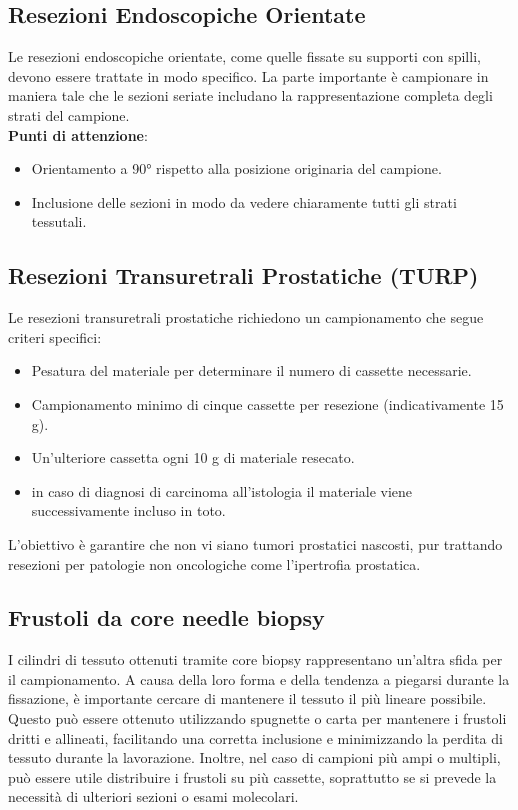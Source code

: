 \subsection{Resezioni Endoscopiche Orientate}
Le resezioni endoscopiche orientate, come quelle fissate su supporti con spilli, devono essere trattate in modo specifico. La parte importante è campionare in maniera tale che le sezioni seriate includano la rappresentazione completa degli strati del campione.
\\ \textbf{Punti di attenzione}:
\begin{itemize}
    \item Orientamento a 90° rispetto alla posizione originaria del campione.
    \item Inclusione delle sezioni in modo da vedere chiaramente tutti gli strati tessutali.
\end{itemize}

\subsection{Resezioni Transuretrali Prostatiche (TURP)}
Le resezioni transuretrali prostatiche richiedono un campionamento che segue criteri specifici:
\begin{itemize} 
    \item Pesatura del materiale per determinare il numero di cassette necessarie.
    \item Campionamento minimo di cinque cassette per resezione (indicativamente 15 g).
    \item Un'ulteriore cassetta ogni 10 g di materiale resecato.
   \item in caso di diagnosi di carcinoma all'istologia il materiale viene successivamente incluso in toto.
\end{itemize}
L'obiettivo è garantire che non vi siano tumori prostatici nascosti, pur trattando resezioni per patologie non oncologiche come l'ipertrofia prostatica.

\subsection{Frustoli da core needle biopsy}

I cilindri di tessuto ottenuti tramite core biopsy rappresentano un'altra sfida per il campionamento. A causa della loro forma e della tendenza a piegarsi durante la fissazione, è importante cercare di mantenere il tessuto il più lineare possibile. Questo può essere ottenuto utilizzando spugnette o carta per mantenere i frustoli dritti e allineati, facilitando una corretta inclusione e minimizzando la perdita di tessuto durante la lavorazione. Inoltre, nel caso di campioni più ampi o multipli, può essere utile distribuire i frustoli su più cassette, soprattutto se si prevede la necessità di ulteriori sezioni o esami molecolari.


